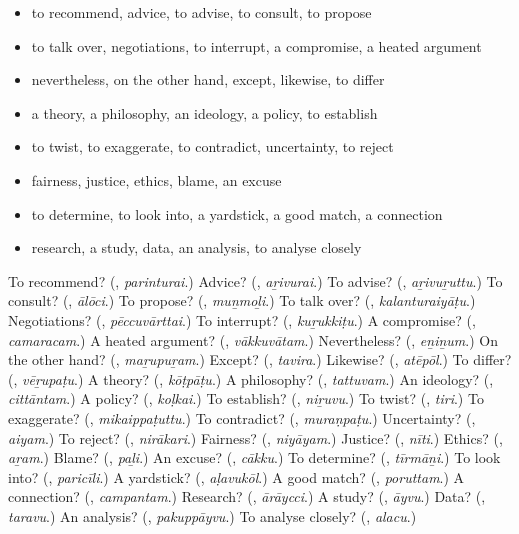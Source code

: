 \begin{itemize}
\raggedright
  \item to recommend, advice, to advise, to consult, to propose
  \item to talk over, negotiations, to interrupt, a compromise, a heated argument
  \item nevertheless, on the other hand, except, likewise, to differ
  \item a theory, a philosophy, an ideology, a policy, to establish
  \item to twist, to exaggerate, to contradict, uncertainty, to reject
  \item fairness, justice, ethics, blame, an excuse
  \item to determine, to look into, a yardstick, a good match, a connection
  \item research, a study, data, an analysis, to analyse closely
\end{itemize}

\begin{tcolorbox}[breakable,colback=teal!4,colframe=teal!35!black,title={Before you move on}]
To recommend? (\textbf{}, \emph{parinturai}.) Advice? (\textbf{}, \emph{aṟivurai}.) To advise? (\textbf{}, \emph{aṟivuṟuttu}.) To consult? (\textbf{}, \emph{ālōci}.) To propose? (\textbf{}, \emph{muṉmoḻi}.) To talk over? (\textbf{}, \emph{kalanturaiyāṭu}.) Negotiations? (\textbf{}, \emph{pēccuvārttai}.) To interrupt? (\textbf{}, \emph{kuṟukkiṭu}.) A compromise? (\textbf{}, \emph{camaracam}.) A heated argument? (\textbf{}, \emph{vākkuvātam}.) Nevertheless? (\textbf{}, \emph{eṉiṉum}.) On the other hand? (\textbf{}, \emph{maṟupuṟam}.) Except? (\textbf{}, \emph{tavira}.) Likewise? (\textbf{}, \emph{atēpōl}.) To differ? (\textbf{}, \emph{vēṟupaṭu}.) A theory? (\textbf{}, \emph{kōṭpāṭu}.) A philosophy? (\textbf{}, \emph{tattuvam}.) An ideology? (\textbf{}, \emph{cittāntam}.) A policy? (\textbf{}, \emph{koḷkai}.) To establish? (\textbf{}, \emph{niṟuvu}.) To twist? (\textbf{}, \emph{tiri}.) To exaggerate? (\textbf{}, \emph{mikaippaṭuttu}.) To contradict? (\textbf{}, \emph{muraṇpaṭu}.) Uncertainty? (\textbf{}, \emph{aiyam}.) To reject? (\textbf{}, \emph{nirākari}.) Fairness? (\textbf{}, \emph{niyāyam}.) Justice? (\textbf{}, \emph{nīti}.) Ethics? (\textbf{}, \emph{aṟam}.) Blame? (\textbf{}, \emph{paḻi}.) An excuse? (\textbf{}, \emph{cākku}.) To determine? (\textbf{}, \emph{tīrmāṉi}.) To look into? (\textbf{}, \emph{paricīli}.) A yardstick? (\textbf{}, \emph{aḷavukōl}.) A good match? (\textbf{}, \emph{poruttam}.) A connection? (\textbf{}, \emph{campantam}.) Research? (\textbf{}, \emph{ārāycci}.) A study? (\textbf{}, \emph{āyvu}.) Data? (\textbf{}, \emph{taravu}.) An analysis? (\textbf{}, \emph{pakuppāyvu}.) To analyse closely? (\textbf{}, \emph{alacu}.)
\end{tcolorbox}
